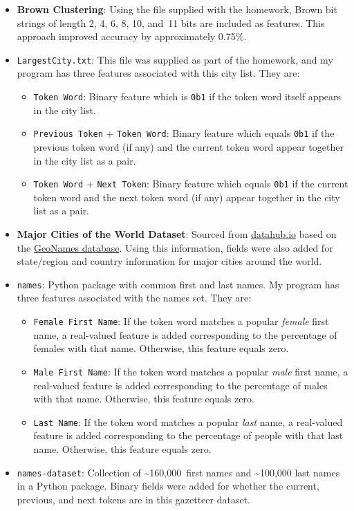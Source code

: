 \documentclass{article}
\begin{document}
  \begin{itemize}
    \item \textbf{Brown Clustering}: Using the file supplied with the homework, Brown bit strings of length 2, 4, 6, 8, 10, and~11 bits are included as features.  This approach improved accuracy by approximately 0.75\%.
    \item \texttt{LargestCity.txt}: This file was supplied as part of the homework, and my program has three features associated with this city list.  They are:
      \begin{itemize}
        \item \texttt{Token Word}: Binary feature which is \texttt{0b1} if the token word itself appears in the city list.
        \item \texttt{Previous Token} + \texttt{Token Word}: Binary feature which equals \texttt{0b1} if the previous token word (if any) and the current token word appear together in the city list as a pair.
        \item \texttt{Token Word} + \texttt{Next Token}: Binary feature which equals \texttt{0b1} if the current token word and the next token word (if any) appear together in the city list as a pair.
      \end{itemize}
    \item \textbf{Major Cities of the World Dataset}: Sourced from \href{https://datahub.io/core/world-cities}{datahub.io} based on the \href{http://www.geonames.org/}{GeoNames database}.  Using this information, fields were also added for state/region and country information for major cities around the world.
    \item \texttt{names}: Python package with common first and last names.  My program has three features associated with the names set.  They are:
      \begin{itemize}
        \item \texttt{Female First Name}: If the token word matches a popular \textit{female} first name, a real-valued feature is added corresponding to the percentage of females with that name.  Otherwise, this feature equals zero.
        \item \texttt{Male First Name}: If the token word matches a popular \textit{male} first name, a real-valued feature is added corresponding to the percentage of males with that name.  Otherwise, this feature equals zero.
        \item \texttt{Last Name}: If the token word matches a popular \textit{last} name, a real-valued feature is added corresponding to the percentage of people with that last name.  Otherwise, this feature equals zero.
      \end{itemize}
    \item \texttt{names-dataset}: Collection of \textasciitilde160,000~first names and \textasciitilde100,000 last names in a Python package.  Binary fields were added for whether the current, previous, and next tokens are in this gazetteer dataset.

  \end{itemize}
\end{document}
